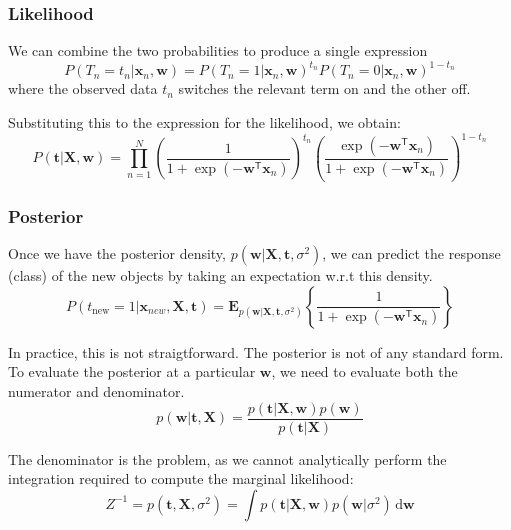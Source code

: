 \documentclass[english,10pt,aspectratio=169,fleqn]{beamer}
\begin{document}
\begin{frame} %
\frametitle{Likelihood}

We can combine the two probabilities to produce a single expression
\begin{equation*}
P(T_{n}=t_{n} | \mathbf{x}_{n}, \mathbf{w}) = 
P(T_{n}=1 | \mathbf{x}_{n}, \mathbf{w})^{t_{n}}
P(T_{n}=0 | \mathbf{x}_{n}, \mathbf{w})^{1-t_{n}}
\end{equation*}
where the observed data $t_{n}$ switches the relevant term on and
the other off.

Substituting this to the expression for the likelihood, we obtain:
\begin{equation*}
P(\mathbf{t} | \mathbf{X}, \mathbf{w}) = \prod_{n=1}^{N}
\left( \frac{1}{1 + \exp(-\mathbf{w}^{\mathsf{T}}\mathbf{x}_{n})} \right)^{t_{n}}
\left( \frac{\exp(-\mathbf{w}^{\mathsf{T}}\mathbf{x}_{n})}%
{1 + \exp(-\mathbf{w}^{\mathsf{T}}\mathbf{x}_{n})} \right)^{1-t_{n}}
\end{equation*}
\end{frame}

\begin{frame}
\frametitle{Posterior}

Once we have the posterior density, $p(\mathbf{w}|\mathbf{X},\mathbf{t},\sigma^2)$,
we can predict the response (class) of the new objects by taking an expectation w.r.t
this density.
\begin{equation*}
P(t_{\mathrm{new}}=1 | \mathbf{x}_{new},\mathbf{X},\mathbf{t}) =
\mathbf{E}_{p(\mathbf{w}|\mathbf{X},\mathbf{t},\sigma^2)}
\left\{
\frac{1}{1 + \exp(-\mathbf{w}^{\mathsf{T}}\mathbf{x}_{n})}
\right\}
\end{equation*}

In practice, this is not straigtforward. The posterior is not of any standard
form. To evaluate the posterior at a particular $\mathbf{w}$, we need to
evaluate both the numerator and denominator.
\begin{equation*}
p(\mathbf{w} | \mathbf{t}, \mathbf{X}) =
\frac{p(\mathbf{t}|\mathbf{X},\mathbf{w}) p(\mathbf{w})}%
{p(\mathbf{t}|\mathbf{X})}
\end{equation*}

The denominator is the problem, as we cannot analytically perform the integration
required to compute the marginal likelihood:
\begin{equation*}
Z^{-1} = p(\mathbf{t},\mathbf{X},\sigma^2) = 
\int p(\mathbf{t}|\mathbf{X},\mathbf{w}) p(\mathbf{w}|\sigma^2)\,\mathrm{d}\mathbf{w}
\end{equation*}

\end{frame}
\end{document}
